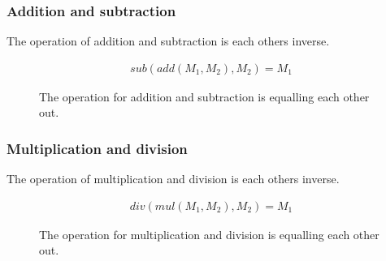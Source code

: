 \subsubsection{Addition and subtraction}
The operation of addition and subtraction is each others inverse.
\begin{figure}[h]
    \begin{center}
        \begin{align*}
            sub(add(M_1,M_2), M_2) = M_1
        \end{align*}
    \end{center}
    \caption{The operation for addition and subtraction is equalling each other out.}
\end{figure}

\FloatBarrier

\subsubsection{Multiplication and division}
The operation of multiplication and division is each others inverse.
\begin{figure}[h]
    \begin{center}
        \begin{align*}
            div(mul(M_1, M_2), M_2) = M_1
        \end{align*}
    \end{center}
    \caption{The operation for multiplication and division is equalling each other out.}
\end{figure}
\FloatBarrier
